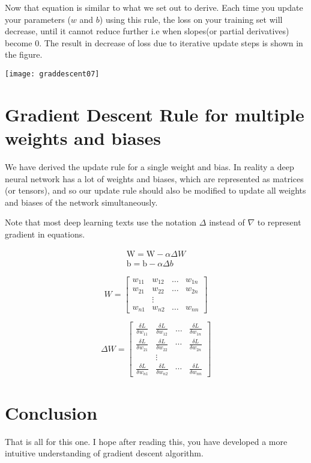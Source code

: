 Now that equation is similar to what we set out to derive.
Each time you update your parameters ($w$ and $b$) using this rule, the loss on your training set will decrease, until it cannot reduce further i.e when slopes(or partial derivatives) become 0. The result in decrease of loss due to iterative update steps is shown in the figure.


\begin{marginfigure}
\texttt{[image: graddescent07]}
\end{marginfigure}

\section{Gradient Descent Rule for multiple weights and biases}

We have derived the update rule for a single weight and bias.
In reality a deep neural network has a lot of weights and biases, which are represented as matrices (or tensors), and so our update rule should also be modified to update all weights and biases of the network simultaneously.

    Note that most deep learning texts use the notation $\Delta$   instead of $\nabla$  to represent gradient in equations.

\begin{equation}
\begin{array}{l}{\mathrm{W}=\mathrm{W}-\alpha \Delta W} \\ {\mathrm{b}=\mathrm{b}-\alpha \Delta b}\end{array}
\end{equation}

\begin{equation}
W=\left[
\begin{array}{cccc}
w_{11}& w_{12}& \ldots& w_{1 n}\\ 
w_{21}& w_{22}& \ldots& w_{2 n} \\ 
&\vdots \\ 
w_{n 1}& w_{n 2} &\ldots &w_{n n}
\end{array}
\right]
\end{equation}

\begin{equation}
\Delta W=
\left[
\begin{array}{cccc}
{\frac{\delta L}{\delta w_{11}}} & {\frac{\delta L}{\delta w_{12}}} & {\dots} & {\frac{\delta L}{\delta w_{1 n}}} \\ 
{\frac{\delta L}{\delta w_{21}}} & {\frac{\delta L}{\delta w_{22}}} & {\cdots} & {\frac{\delta L}{\delta w_{2 n}}} \\ 
{} & {\vdots} \\ 
{\frac{\delta L}{\delta w_{n 1}}} &{\frac{\delta L}{\delta w_{n 2}}} & {\cdots} & {\frac{\delta L}{\delta w_{n n}}}
\end{array}
\right]
\end{equation}

\section{Conclusion}

That is all for this one. I hope after reading this, you have developed a more intuitive understanding of gradient descent algorithm. 